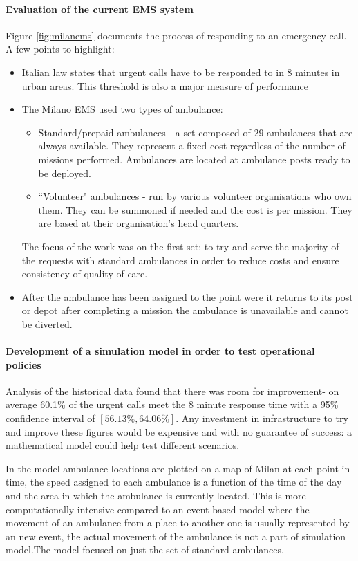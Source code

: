 \documentclass[11pt]{article} %
\begin{document}
\paragraph{Evaluation of the current EMS system }
	Figure \ref{fig:milanems} documents  the process of responding to an emergency call. A few points to highlight: 
	\begin{itemize}
		\item Italian law states that urgent calls have to be responded to in 8 minutes in urban areas. This threshold is also a major measure of performance 
		\item The Milano EMS used two types of ambulance: 
		\begin{itemize}
			\item Standard/prepaid ambulances - a set composed of 29 ambulances that are always available. They represent a fixed cost regardless of the number of missions performed. Ambulances are located at ambulance posts ready to be deployed.
			\item ``Volunteer" ambulances - run by various volunteer organisations who own them. They can be summoned if needed and the cost is per mission. They are based at their organisation's head quarters.
		\end{itemize}
		The focus of the work was on the first set: to try and serve the majority of the requests with standard ambulances in order to reduce costs and ensure consistency of quality of care. 
		\item After the ambulance has been assigned to the point were it returns to its post or depot after completing a mission the ambulance is unavailable and cannot be diverted. 
	\end{itemize}
\paragraph{Development of a simulation model in order to test operational policies }
Analysis of the historical data found that there was room for improvement- on average 60.1\% of the urgent calls meet the 8 minute response time with a 95\% confidence interval of $ [56.13\%, 64.06\%] $. Any investment in infrastructure to try and improve these figures would be expensive and with no guarantee of success: a mathematical model could help test different scenarios. 

In the model ambulance locations are plotted on a map of Milan at each point in time, the speed assigned to each ambulance is a function of the time of the day and the area in which the ambulance is currently located. This is more  computationally intensive compared to an event based model where the movement of an ambulance from a place to another one is usually represented by an new event, the actual movement of the ambulance is not a part of simulation model.The model focused on just the set of standard ambulances.
\end{document}
